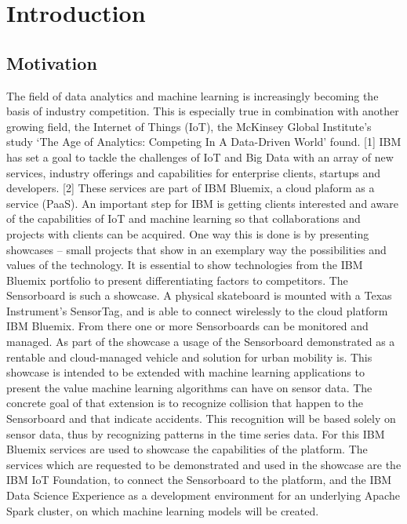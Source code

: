 \chapter{Introduction}
\section{Motivation}
The field of data analytics and machine learning is increasingly becoming the basis of industry competition. This is especially true in combination with another growing field, the Internet of Things (IoT), the McKinsey Global Institute’s study ‘The Age of Analytics: Competing In A Data-Driven World’ found. [1] IBM has set a goal to tackle the challenges of IoT and Big Data with an array of new services, industry offerings and capabilities for enterprise clients, startups and developers. [2] These services are part of IBM Bluemix, a cloud plaform  as a service (PaaS). 
\newline
An important step for IBM is getting clients interested and aware of the capabilities of IoT and machine learning so that collaborations and projects with clients can be acquired. One way this is done is by presenting showcases – small projects that show in an exemplary way the possibilities and values of the technology. It is essential to show technologies from the IBM Bluemix portfolio to present differentiating factors to competitors.
 \newline
The Sensorboard is such a showcase. A physical skateboard is mounted with a Texas Instrument’s SensorTag, and is able to connect wirelessly to the cloud platform IBM Bluemix. From there one or more Sensorboards can be monitored and managed. As part of the showcase a usage of the Sensorboard demonstrated as a rentable and cloud-managed vehicle and solution for urban mobility is.
 \newline
This showcase is intended to be extended with machine learning applications to present the value machine learning algorithms can have on sensor data. The concrete goal of that extension is to recognize collision that happen to the Sensorboard and that indicate accidents. This recognition will be based solely on sensor data, thus by recognizing patterns in the time series data. For this IBM Bluemix services are used to showcase the capabilities of the platform. The services which are requested to be demonstrated and used in the showcase are the IBM IoT Foundation, to connect the Sensorboard to the platform, and the IBM Data Science Experience as a development environment for an underlying Apache Spark cluster, on which machine learning models will be created.

